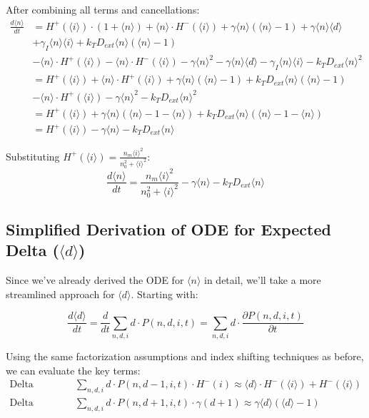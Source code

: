 \documentclass{article}
\begin{document}
\begin{flushleft}
After combining all terms and cancellations:
\begin{align*}
\frac{d\langle n \rangle}{dt} &= H^+(\langle i \rangle) \cdot (1 + \langle n \rangle) + \langle n \rangle \cdot H^-(\langle i \rangle) + \gamma \langle n \rangle (\langle n \rangle - 1) + \gamma \langle n \rangle \langle d \rangle \\
&+ \gamma_I \langle n \rangle \langle i \rangle + k_T D_{ext} \langle n \rangle (\langle n \rangle - 1) \\
&- \langle n \rangle \cdot H^+(\langle i \rangle) - \langle n \rangle \cdot H^-(\langle i \rangle) - \gamma \langle n \rangle^2 - \gamma \langle n \rangle \langle d \rangle - \gamma_I \langle n \rangle \langle i \rangle - k_T D_{ext} \langle n \rangle^2 \\
&= H^+(\langle i \rangle) + \langle n \rangle \cdot H^+(\langle i \rangle) + \gamma \langle n \rangle (\langle n \rangle - 1) + k_T D_{ext} \langle n \rangle (\langle n \rangle - 1) \\
&- \langle n \rangle \cdot H^+(\langle i \rangle) - \gamma \langle n \rangle^2 - k_T D_{ext} \langle n \rangle^2 \\
&= H^+(\langle i \rangle) + \gamma \langle n \rangle (\langle n \rangle - 1 - \langle n \rangle) + k_T D_{ext} \langle n \rangle (\langle n \rangle - 1 - \langle n \rangle) \\
&= H^+(\langle i \rangle) - \gamma \langle n \rangle - k_T D_{ext} \langle n \rangle
\end{align*}

Substituting $H^+(\langle i \rangle)=\frac{n_m \langle i \rangle^2}{n_0^2 + \langle i \rangle^2}$:
$$\frac{d\langle n \rangle}{dt} = \frac{n_m \langle i \rangle^2}{n_0^2 + \langle i \rangle^2} - \gamma \langle n \rangle - k_T D_{ext} \langle n \rangle$$

\subsection*{Simplified Derivation of ODE for Expected Delta ($\langle d \rangle$)}

Since we've already derived the ODE for $\langle n \rangle$ in detail, we'll take a more streamlined approach for $\langle d \rangle$. Starting with:

$$\frac{d\langle d \rangle}{dt} = \frac{d}{dt}\sum_{n,d,i} d \cdot P(n,d,i,t) = \sum_{n,d,i} d \cdot \frac{\partial P(n,d,i,t)}{\partial t}$$

Using the same factorization assumptions and index shifting techniques as before, we can evaluate the key terms:
\begin{align*}
\text{Delta production term:} &\quad \sum_{n,d,i} d \cdot P(n,d-1,i,t) \cdot H^-(i) \approx \langle d \rangle \cdot H^-(\langle i \rangle) + H^-(\langle i \rangle) \\
\text{Delta decay term:} &\quad \sum_{n,d,i} d \cdot P(n,d+1,i,t) \cdot \gamma(d+1) \approx \gamma \langle d \rangle (\langle d \rangle - 1)
\end{align*}


\end{flushleft}
\end{document}
